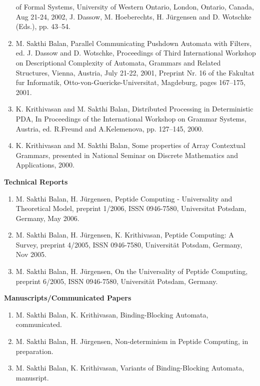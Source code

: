 \documentclass[11pt]{article}
\begin{document}
\begin{enumerate}
of Formal Systems, University of Western Ontario, London, Ontario,
Canada, Aug 21-24, 2002, J. Dassow, M. Hoeberechts, H. J\"{u}rgensen and
D. Wotschke (Eds.), pp. 43--54.
\item M. Sakthi Balan, Parallel Communicating Pushdown Automata with
Filters, ed. J. Dassow and D. Wotschke, Proceedings of Third
International Workshop on Descriptional Complexity of Automata,
Grammars and Related Structures, Vienna, Austria, July 21-22, 2001,
Preprint Nr. 16 of the Fakultat fur Informatik,
Otto-von-Guericke-Universitat, Magdeburg, pages 167--175, 2001.
\item K. Krithivasan and M. Sakthi Balan, Distributed Processing in
Deterministic PDA, In Proceedings of the International Workshop on
Grammar Systems, Austria, ed. R.Freund and A.Kelemenova, pp.  127--145,
2000.
\item K. Krithivasan and M. Sakthi Balan, Some properties of Array
Contextual Grammars, presented in National Seminar on Discrete
Mathematics and Applications, 2000.
\end{enumerate}

{\large \bf Technical Reports}

\begin{enumerate}
\item M. Sakthi Balan, H. J\"{u}rgensen, Peptide Computing - Universality
and Theoretical Model, preprint 1/2006, ISSN 0946-7580, Universitat
Potsdam, Germany, May 2006.
\item M. Sakthi Balan, H. J\"{u}rgensen, K. Krithivasan, Peptide
  Computing: A Survey, preprint 4/2005, ISSN 0946-7580,
  Universit\"{a}t Potsdam, Germany, Nov 2005.
\item M. Sakthi Balan, H. J\"{u}rgensen, On the Universality of
Peptide Computing, preprint 6/2005, ISSN 0946-7580, Universit\"{a}t
Potsdam, Germany.
\end{enumerate}

{\large \bf Manuscripts/Communicated Papers}

\begin{enumerate}
\item M. Sakthi Balan, K. Krithivasan, Binding-Blocking Automata, communicated.
\item M. Sakthi Balan, H. J\"{u}rgensen, Non-determinism in Peptide Computing, in preparation.
\item M. Sakthi Balan, K. Krithivasan, Variants of Binding-Blocking
Automata, manusript.

\end{enumerate}
\end{document}

